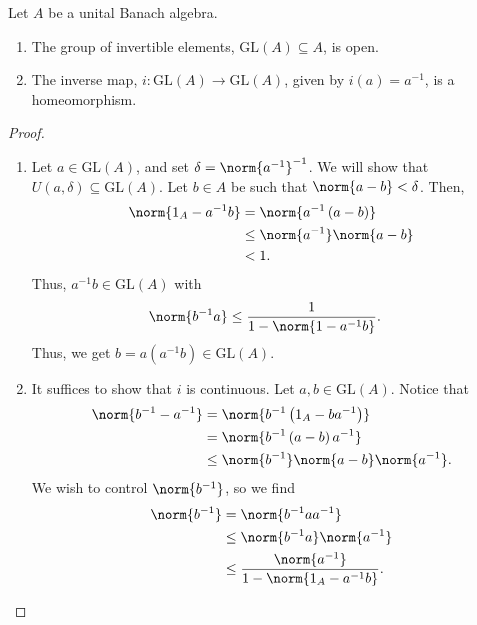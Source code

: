 \documentclass[10pt]{mypackage}
\newcommand{\GL}{\text{GL}}
\begin{document}
\begin{proposition}
  Let $A$ be a unital Banach algebra.
  \begin{enumerate}[(1)]
    \item The group of invertible elements, $\GL\left(A\right)\subseteq A$, is open.
    \item The inverse map, $i\colon \GL\left(A\right)\rightarrow \GL\left(A\right)$, given by $i\left(a\right) = a^{-1}$, is a homeomorphism.
  \end{enumerate}
\end{proposition}
\begin{proof}\hfill
  \begin{enumerate}[(1)]
    \item Let $a\in \GL\left(A\right)$, and set $\delta = \norm{a^{-1}}^{-1}$. We will show that $U\left(a,\delta\right)\subseteq \GL\left(A\right)$. Let $b\in A$ be such that $\norm{a-b} < \delta$. Then,
      \begin{align*}
        \norm{1_A - a^{-1}b} &= \norm{a^{-1}\left(a-b\right)}\\
                             &\leq \norm{a^{-1}}\norm{a-b}\\
                             &< 1.
      \end{align*}
      Thus, $a^{-1}b\in \GL\left(A\right)$ with
      \begin{align*}
        \norm{b^{-1}a} &\leq \frac{1}{1-\norm{1-a^{-1}b}}.
      \end{align*}
      Thus, we get $b = a\left(a^{-1}b\right) \in \GL\left(A\right)$.
    \item It suffices to show that $i$ is continuous. Let $a,b\in \GL\left(A\right)$. Notice that
      \begin{align*}
        \norm{b^{-1} - a^{-1}} &= \norm{b^{-1}\left(1_A - ba^{-1}\right)}\\
                               &= \norm{b^{-1}\left(a-b\right)a^{-1}}\\
                               &\leq \norm{b^{-1}}\norm{a-b}\norm{a^{-1}}.
      \end{align*}
      We wish to control $\norm{b^{-1}}$, so we find
      \begin{align*}
        \norm{b^{-1}} &= \norm{b^{-1}aa^{-1}}\\
                      &\leq \norm{b^{-1}a}\norm{a^{-1}}\\
                      &\leq \frac{\norm{a^{-1}}}{1-\norm{1_A - a^{-1}b}}.
      \end{align*}

\end{enumerate}
\end{proof}
\end{document}

